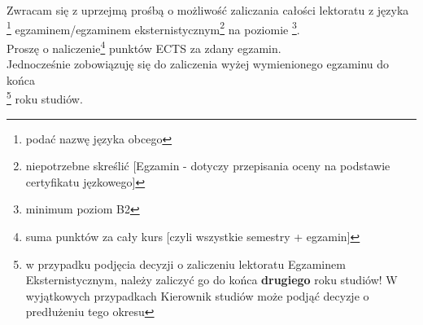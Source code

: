 \documentclass{wmiisubmission}
\begin{document}
\cracowdate
{}
\studentaddress
\addressee{\piotrniemiec}

\vskip 2.0cm

Zwracam się z uprzejmą prośbą o możliwość zaliczania całości
lektoratu z języka \\
\fillField{3.5cm} \footnote{podać nazwę języka obcego}
egzaminem/egzaminem eksternistycznym\footnote{niepotrzebne skreślić [Egzamin -
dotyczy przepisania oceny na podstawie certyfikatu jęzkowego]}
na poziomie \dotfill\footnote{minimum poziom B2}. \\

Proszę o naliczenie\fillField{3cm}\footnote{suma punktów za cały kurs [czyli
wszystkie semestry + egzamin]} punktów ECTS za zdany egzamin.\\

Jednocześnie zobowiązuję się do zaliczenia wyżej wymienionego egzaminu do końca\\
\fillField{3cm}\footnote{w przypadku podjęcia decyzji o zaliczeniu lektoratu
Egzaminem Eksternistycznym, należy zaliczyć go do końca \textbf{drugiego} roku
studiów! W wyjątkowych przypadkach Kierownik studiów może podjąć decyzje o
predłużeniu tego okresu} roku studiów.

\vskip 2.0cm

\studentsignature

\vskip 1.0cm
\end{document}
